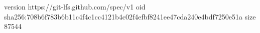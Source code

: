 version https://git-lfs.github.com/spec/v1
oid sha256:708b6f783b6b11c4f4c1cc4121b4c02f4efbf8241ee47cda240e4bdf7250e51a
size 87544
